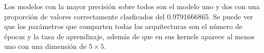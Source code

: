 Los modelos con la mayor precisión sobre todos son el modelo uno y
dos con una proporción de valores correctamente clasficados del
0.9791666865. Se puede ver que los parámetros que comparten todas
las arquitecturas son el número de épocas y la tasa de aprendizaje,
además de que en sus kernels aparece al menos uno con una dimensión 
de $5 \times 5$.

%
%
